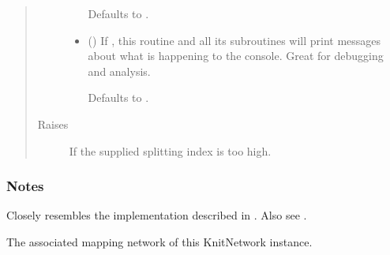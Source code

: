 \documentclass[letterpaper,10pt,english]{sphinxmanual}
\begin{document}
\begin{fulllineitems}
\begin{fulllineitems}
\begin{quote}
\begin{description}
\begin{itemize}
Defaults to .


\item {} 
 (\sphinxstyleliteralemphasis{\sphinxupquote{, }}) \textendash{} 
If , this routine and all its subroutines will print
messages about what is happening to the console. Great for
debugging and analysis.

Defaults to .


\end{itemize}

\item[{Raises}] \leavevmode
{\hyperref[\detokenize{cockatoo:cockatoo.exception.KnitNetworkError}]{}} \textendash{} If the supplied splitting index is too high.

\end{description}\end{quote}
\subsubsection*{Notes}

Closely resembles the implementation described in  \sphinxfootnotemark[1]. Also see
 \sphinxfootnotemark[2].

\end{fulllineitems}


\begin{fulllineitems}
\label{\detokenize{cockatoo:cockatoo.KnitNetwork.mapping_network}}
The associated mapping network of this KnitNetwork instance.

\end{fulllineitems}



\end{fulllineitems}
\end{document}
